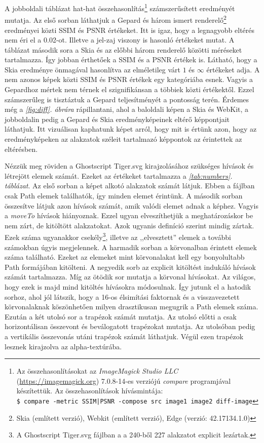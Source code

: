 \documentclass[12pt]{report}
\theoremstyle{definition}
\newcommand{\func}[1]{{\textsl{#1}}}
\begin{document}
A jobboldali táblázat hat-hat összehasonlítás\footnote{Az összehasonlításokat
az \emph{ImageMagick Studio LLC} ({\footnotesize\url{https://imagemagick.org}})
7.0.8-14-es verziójú \func{compare} programjával készítettük. Az
összehasonlítások hívásmintája:\\ \texttt{\$ compare -metric SSIM|PSNR -compose
src image1 image2 diff-image} } számszerűsített eredményét mutatja. Az első
sorban láthatjuk a Gepard és három ismert renderelő\footnote{Skia (említett
verzió), Webkit (említett verzió), Edge (verzió: 42.17134.1.0)} eredményei
közti SSIM és PSNR értékeket. Itt is igaz, hogy a legnagyobb eltérés nem éri el
a 0.02-ot. Illetve a jel-zaj viszony is hasonló értékeket mutat. A táblázat
második sora a Skia és az előbbi három renderelő közötti méréseket tartalmazza.
Így jobban érthetőek a SSIM és a PSNR értékek is. Látható, hogy a Skia
eredménye önmagával hasonlítva az elméletileg várt $1$ és $\infty$ értékeket
adja. A nem azonos képek közti SSIM és PSNR értékek egy kategóriába esnek.
Vagyis a Gepardhoz mértek nem térnek el szignifikánsan a többiek közti
értékektől. Ezzel számszerűleg is tisztáztuk a Gepard teljesítményét a
pontosság terén. Érdemes még a \emph{\ref{fig:diff}. ábrára} rápillantani, ahol
a baloldali képen a Skia és WebKit, a jobboldalin pedig a Gepard és Skia
eredményképeinek eltérő képpontjait láthatjuk. Itt vizuálisan kaphatunk képet
arról, hogy mit is értünk azon, hogy az eredményképeken az alakzatok széleit
tartalmazó képpontok az érintettek az eltérésben.

Nézzük meg röviden a Ghostscript Tiger.svg kirajzolásához szükséges hívások és
létrejött elemek számát. Ezeket az értékeket tartalmazza a
\emph{\ref{tab:numbers}. táblázat}. Az első sorban a képet alkotó alakzatok
számát látjuk. Ebben a fájlban csak Path elemek találhatók, így minden elemet
érintünk. A második sorban összesítve látjuk azon hívások számát, amik valódi
elemet adnak a képhez. Vagyis a \func{moveTo} hívások hiányoznak. Ezzel ugyan
elveszíthetjük a meghatározáskor be nem zárt, de kitöltött alakzatokat. Azok
ugyanis definíció szerint mindig zártak. Ezek száma ugyanakkor
csekély\footnote{A Ghostscript Tiger.svg fájlban a a 240-ből 227 alakzatot
explicit lezártak.}, illetve az ,,elvesztett'' elemek a további számokban úgyis
megjelennek. A harmadik sorban a körvonalban érintett elemek száma található.
Ezeket az elemeket mint körvonalakat kell egy bonyolultabb Path formájában
kitölteni. A negyedik sorb az explicit kitöltést indukáló hívások számát
tartalmazza. Míg az ötödik sor mutatja a körvonal hívásokat. Az világos, hogy
ezek is majd mind kitöltés hívásokra módosulnak. Így jutunk el a hatodik
sorhoz, ahol jól látszik, hogy a 16-os élsimítási faktornak és a visszavezetett
körvonalaknak köszönhetően milyen drasztikusan megugrik a Path elemek száma.
Ezután a két utolsó sor a trapézok számát mutatja. Az utolsó előtti a csak
horizontálisan összevont és beválogatott trapézokat mutatja. Az utolsóban pedig
a vertikális összevonás utáni trapézok számát láthatjuk. Végül ezen trapézok
lesznek kirajzolva az alpha-textúrába.
\end{document}
